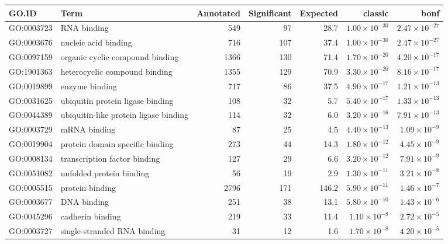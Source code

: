\begin{table}[ht]
\centering
\begin{adjustbox}{max width=\textwidth}
\begin{tabular}{llrrrrr}
  \hline
GO.ID & Term & Annotated & Significant & Expected & classic & bonf \\ 
  \hline
GO:0003723 & RNA binding & 549 & 97 & 28.7 & $1.00 \times 10^{-30}$ & $2.47 \times 10^{-27}$ \\ 
  GO:0003676 & nucleic acid binding & 716 & 107 & 37.4 & $1.00 \times 10^{-30}$ & $2.47 \times 10^{-27}$ \\ 
  GO:0097159 & organic cyclic compound binding & 1366 & 130 & 71.4 & $1.70 \times 10^{-20}$ & $4.20 \times 10^{-17}$ \\ 
  GO:1901363 & heterocyclic compound binding & 1355 & 129 & 70.9 & $3.30 \times 10^{-20}$ & $8.16 \times 10^{-17}$ \\ 
  GO:0019899 & enzyme binding & 717 & 86 & 37.5 & $4.90 \times 10^{-17}$ & $1.21 \times 10^{-13}$ \\ 
  GO:0031625 & ubiquitin protein ligase binding & 108 & 32 & 5.7 & $5.40 \times 10^{-17}$ & $1.33 \times 10^{-13}$ \\ 
  GO:0044389 & ubiquitin-like protein ligase binding & 114 & 32 & 6.0 & $3.20 \times 10^{-16}$ & $7.91 \times 10^{-13}$ \\ 
  GO:0003729 & mRNA binding & 87 & 25 & 4.5 & $4.40 \times 10^{-13}$ & $1.09 \times 10^{-9}$ \\ 
  GO:0019904 & protein domain specific binding & 273 & 44 & 14.3 & $1.80 \times 10^{-12}$ & $4.45 \times 10^{-9}$ \\ 
  GO:0008134 & transcription factor binding & 127 & 29 & 6.6 & $3.20 \times 10^{-12}$ & $7.91 \times 10^{-9}$ \\ 
  GO:0051082 & unfolded protein binding & 56 & 19 & 2.9 & $1.30 \times 10^{-11}$ & $3.21 \times 10^{-8}$ \\ 
  GO:0005515 & protein binding & 2796 & 171 & 146.2 & $5.90 \times 10^{-11}$ & $1.46 \times 10^{-7}$ \\ 
  GO:0003677 & DNA binding & 251 & 38 & 13.1 & $5.80 \times 10^{-10}$ & $1.43 \times 10^{-6}$ \\ 
  GO:0045296 & cadherin binding & 219 & 33 & 11.4 & $1.10 \times 10^{-8}$ & $2.72 \times 10^{-5}$ \\ 
  GO:0003727 & single-stranded RNA binding & 31 & 12 & 1.6 & $1.70 \times 10^{-8}$ & $4.20 \times 10^{-5}$ \\ 

\end{tabular}
\end{adjustbox}
\end{table}
